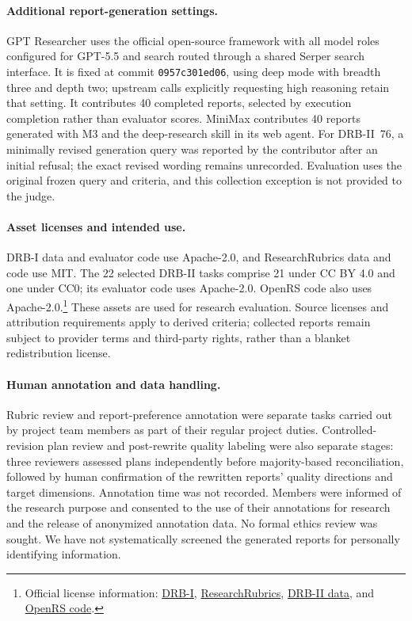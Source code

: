 \documentclass{article}
\begin{document}
\paragraph{Additional report-generation settings.}
GPT Researcher uses the official open-source framework with all model roles configured for GPT-5.5 and search routed through a shared Serper search interface. It is fixed at commit \texttt{0957c301ed06}, using deep mode with breadth three and depth two; upstream calls explicitly requesting high reasoning retain that setting. It contributes 40 completed reports, selected by execution completion rather than evaluator scores. MiniMax contributes 40 reports generated with M3 and the deep-research skill in its web agent. For DRB-II~76, a minimally revised generation query was reported by the contributor after an initial refusal; the exact revised wording remains unrecorded. Evaluation uses the original frozen query and criteria, and this collection exception is not provided to the judge.



\paragraph{Asset licenses and intended use.}
DRB-I data and evaluator code use Apache-2.0, and ResearchRubrics data and code use MIT. The 22 selected DRB-II tasks comprise 21 under CC BY 4.0 and one under CC0; its evaluator code uses Apache-2.0. OpenRS code also uses Apache-2.0.\footnote{Official license information: \href{https://huggingface.co/datasets/muset-ai/DeepResearch-Bench-Dataset}{DRB-I}, \href{https://huggingface.co/datasets/ScaleAI/researchrubrics}{ResearchRubrics}, \href{https://github.com/imlrz/DeepResearch-Bench-II/blob/main/DATA_LICENSE}{DRB-II data}, and \href{https://github.com/Qwen-Applications/OpenRS/blob/master/LICENSE}{OpenRS code}.} These assets are used for research evaluation. Source licenses and attribution requirements apply to derived criteria; collected reports remain subject to provider terms and third-party rights, rather than a blanket redistribution license.

\paragraph{Human annotation and data handling.}
Rubric review and report-preference annotation were separate tasks carried out by project team members as part of their regular project duties. Controlled-revision plan review and post-rewrite quality labeling were also separate stages: three reviewers assessed plans independently before majority-based reconciliation, followed by human confirmation of the rewritten reports' quality directions and target dimensions. Annotation time was not recorded. Members were informed of the research purpose and consented to the use of their annotations for research and the release of anonymized annotation data. No formal ethics review was sought. We have not systematically screened the generated reports for personally identifying information.
\end{document}
